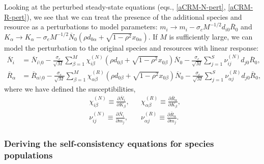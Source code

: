 \documentclass[10pt]{article}
\begin{document}
Looking at the perturbed steady-state equations (eqs., \ref{aCRM-N-pert}, \ref{aCRM-R-pert}), we see that we can treat the presence of the additional species and resource as a perturbations to model parameters: $m_i \to m_i - \sigma_c M^{-1/2} d_{i0} \overline R_0$ and $K_\alpha \to K_\alpha - \sigma_e M^{-1/2} \overline N_0 \left(
	\rho d_{0\alpha} + \sqrt{1-\rho^2} x_{0\alpha}
\right)$.
If $M$ is sufficiently large, we can model the perturbation to the original species and resources with linear response:
\begin{align}
	\overline N_i
	&=
	\overline N_{i\setminus 0}
	-
	\frac{\sigma_e}{\sqrt{M}}
	\sum_{\beta = 1}^M
	\chi_{i\beta}^{(N)}
	 \left(
		\rho d_{0\beta} + \sqrt{1-\rho^2} x_{0\beta}
	\right)\overline N_0
	-
	\frac{\sigma_c}{\sqrt{M}}
	\sum_{j=1}^S
	\nu_{i j}^{(N)}
	d_{j0}
	\overline R_0
	,
	\\
	\overline R_\alpha
	&=
	\overline R_{\alpha \setminus 0}
	-
	\frac{\sigma_e}{\sqrt{M}}
	\sum_{\beta=1}^{M}
	\chi_{\alpha\beta}^{(R)}
	\left(
		\rho d_{0\beta}
		+
		\sqrt{1-\rho^2} x_{0\beta}
	\right)
	\overline N_0
	-
	\frac{\sigma_c}{\sqrt{M}}
	\sum_{j=1}^S
	\nu_{\alpha j}^{(R)} d_{j0} \overline R_0
	,
\end{align}
where we have defined the susceptibilities,
\begin{align}
	&
	\chi_{i\beta}^{(N)}
	\equiv
	\frac{\partial \overline N_i}{\partial K_\beta},
	&&
	\chi_{\alpha\beta}^{(R)}
	\equiv
	\frac{\partial \overline R_\alpha}{\partial K_\beta},
	\\
	&
	\nu_{ij}^{(N)}
	\equiv
	\frac{\partial\overline N_i}{\partial m_j},
	&&
	\nu_{\alpha j}^{(R)}
	\equiv
	\frac{\partial \overline R_\alpha}{\partial m_j}.
\end{align}

\subsubsection{Deriving the self-consistency equations for species populations}
\end{document}
